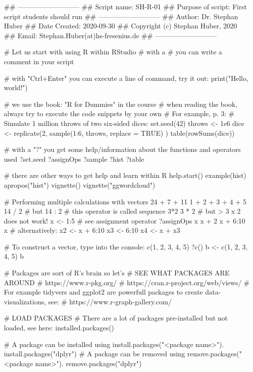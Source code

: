 \begin{rblock1}
	## ---------------------------
	## Script name: SH-R-01
	## Purpose of script: First script students should run
	## ---------------------------
	## Author: Dr. Stephan Huber
	## Date Created: 2020-09-30
	## Copyright (c) Stephan Huber, 2020
	## Email: Stephan.Huber(at)hs-fresenius.de
	## ---------------------------
	
	
	# Let us start with using R within RStudio
	# with a # you can write a comment in your script
	
	# with "Ctrl+Enter" you can execute a line of command, try it out:
	print("Hello, world!")
	
	# we use the book: "R for Dummies" in the course
	# when reading the book, always try to execute the code snippets by your own
	# For example, p. 3:
	# Simulate 1 million throws of two six‐sided dices:
	set.seed(42)
	throws <- 1e6
	dice <- replicate(2,
	sample(1:6, throws, replace = TRUE)
	)
	table(rowSums(dice))
	
	# with a "?" you get some help/information about the functions and operators used 
	?set.seed
	?assignOps
	?sample
	?hist
	?table
	
	# there are other ways to get help and learn within R
	help.start()
	example(hist)
	apropos("hist")
	vignette()
	vignette("ggwordcloud")
	
	# Performing multiple calculations with vectors
	24 + 7 + 11
	1 + 2 + 3 + 4 + 5
	14 / 2
	# but
	14 : 2 # this operator is called sequence
	3*2
	3      *       2
	# but > 3 x 2 does not work!
	x <- 1:5  # see assignment operator ?assignOps
	x
	x + 2
	x + 6:10
	x
	# alternatively:
	x2 <- x + 6:10
	x3 <- 6:10
	x4 <- x + x3
	
	# To construct a vector, type into the console:
	c(1, 2, 3, 4, 5)
	?c()
	b <- c(1, 2, 3, 4, 5)
	b
	
	# Packages are sort of R's brain so let's 
	# SEE WHAT PACKAGES ARE AROUND
	# https://www.r-pkg.org/
	# https://cran.r-project.org/web/views/
	# For example tidyvers and ggplot2 are powerfull packages to create data-visualizations, see:
	# https://www.r-graph-gallery.com/
	
	# LOAD PACKAGES 
	# There are a lot of packages pre-installed but not loaded, see here: 
	installed.packages()
	
	# A package can be installed using install.packages("<package name>"). 
	install.packages("dplyr")
	# A package can be removed using remove.packages("<package name>").
	remove.packages("dplyr")
	

\end{rblock1}
